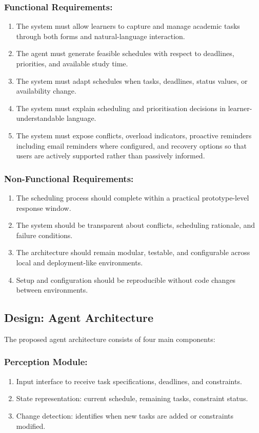\documentclass[12pt]{article}
\begin{document}
\subsubsection{Functional Requirements:}
\begin{enumerate}
    \item The system must allow learners to capture and manage academic tasks through both forms and natural-language interaction.
    \item The agent must generate feasible schedules with respect to deadlines, priorities, and available study time.
    \item The system must adapt schedules when tasks, deadlines, status values, or availability change.
    \item The system must explain scheduling and prioritisation decisions in learner-understandable language.
    \item The system must expose conflicts, overload indicators, proactive reminders including email reminders where configured, and recovery options so that users are actively supported rather than passively informed.
\end{enumerate}

\subsubsection{Non-Functional Requirements:}
\begin{enumerate}
    \item The scheduling process should complete within a practical prototype-level response window.
    \item The system should be transparent about conflicts, scheduling rationale, and failure conditions.
    \item The architecture should remain modular, testable, and configurable across local and deployment-like environments.
    \item Setup and configuration should be reproducible without code changes between environments.
\end{enumerate} 
\subsection{Design: Agent Architecture}
The proposed agent architecture consists of four main components:
\subsubsection{Perception Module:}
\begin{enumerate}
    \item Input interface to receive task specifications, deadlines, and constraints.
    \item State representation: current schedule, remaining tasks, constraint status.
    \item  Change detection: identifies when new tasks are added or constraints modified.
\end{enumerate}
\end{document}

